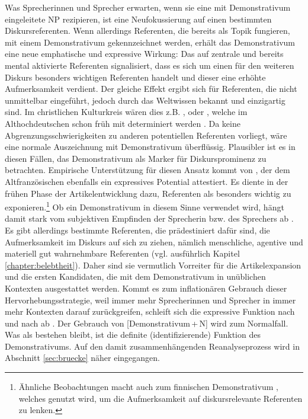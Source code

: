 Was Sprecherinnen und Sprecher erwarten, wenn sie eine mit Demonstrativum eingeleitete NP rezipieren, ist eine Neufokussierung auf einen bestimmten Diskursreferenten. Wenn allerdings Referenten, die bereits als Topik fungieren, mit einem Demonstrativum gekennzeichnet werden, erhält das Demonstrativum eine neue emphatische und expressive Wirkung: Das  auf zentrale und bereits mental aktivierte Referenten signalisiert, dass es sich um einen für den weiteren Diskurs besonders wichtigen Referenten handelt und dieser eine erhöhte Aufmerksamkeit verdient. Der gleiche Effekt ergibt sich für Referenten, die nicht unmittelbar eingeführt, jedoch durch das Weltwissen bekannt und einzigartig sind. Im christlichen Kulturkreis wären dies z.B. ,  oder , welche im Althochdeutschen schon früh mit  determiniert werden \parencite{Oubouzar1989}. Da keine Abgrenzungsschwierigkeiten zu anderen potentiellen Referenten vorliegt,  wäre eine normale Auszeichnung mit Demonstrativum überflüssig. Plausibler ist es in diesen Fällen, das Demonstrativum als Marker für Diskursprominenz zu betrachten. Empirische Unterstützung für diesen Ansatz kommt von \textcite{Epstein1993,Epstein1994}, der dem Altfranzösischen  ebenfalls ein expressives Potential attestiert. Es diente in der frühen Phase der Artikelentwicklung dazu, Referenten als besonders wichtig zu exponieren.\footnote{Ähnliche Beobachtungen macht auch \textcite{Laury1997} zum finnischen Demonstrativum , welches genutzt wird, um die Aufmerksamkeit auf diskursrelevante Referenten zu lenken.} 
Ob ein Demonstrativum in diesem Sinne verwendet wird, hängt damit stark vom subjektiven Empfinden der Sprecherin bzw. des Sprechers ab \parencite[128]{Epstein1993}. Es gibt allerdings bestimmte Referenten, die prädestiniert dafür sind, die Aufmerksamkeit im Diskurs auf sich zu ziehen, nämlich menschliche, agentive und materiell gut wahrnehmbare Referenten (vgl. ausführlich Kapitel \ref{chapter:belebtheit}). Daher sind sie vermutlich Vorreiter für die Artikelexpansion und die ersten Kandidaten, die mit dem Demonstrativum in unüblichen Kontexten ausgestattet werden. Kommt es zum inflationären Gebrauch dieser Hervorhebungsstrategie, weil immer mehr Sprecherinnen und Sprecher in immer mehr Kontexten darauf zurückgreifen, schleift sich die expressive Funktion nach und nach ab \parencite[vgl. das Prinzip der unsichtbaren Hand nach][]{Keller1994}. Der Gebrauch von [Demonstrativum\,+\,N] wird zum Normalfall. Was als  bestehen bleibt, ist die definite (identifizierende) Funktion des  Demonstrativums. Auf den damit zusammenhängenden Reanalyseprozess wird in Abschnitt \ref{sec:bruecke} näher eingegangen.  

